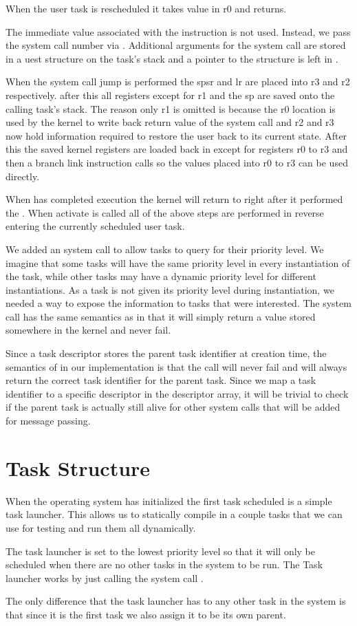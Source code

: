 \documentclass[pdftex,10pt,a4paper]{article}
\begin{document}
When the user task is rescheduled it takes value in r0 and returns.

The immediate value associated with the  instruction is not
used. Instead, we pass the system call number via . Additional
arguments for the system call are stored in a uest
structure on the task's stack and a pointer to the structure is left
in .

When the system call jump is performed the spsr and lr are placed into
r3 and r2 respectively. after this all registers except for r1 and the sp
are saved onto the calling task's stack. The reason only r1 is omitted is
because the r0 location is used by the kernel to write back return value of
the system call and r2 and r3 now hold information required to restore the user
back to its current state. After this the saved kernel registers are loaded back
in except for registers r0 to r3 and then a branch link instruction calls 
 so the values placed into r0 to r3 can be used directly.

When  has completed execution the kernel will return to right
after it performed the . When activate is called all of the
above steps are performed in reverse entering the currently scheduled user task.

We added an  system call to allow tasks to query
for their priority level. We imagine that some tasks will have the
same priority level in every instantiation of the task, while other
tasks may have a dynamic priority level for different
instantiations. As a task is not given its priority level during
instantiation, we needed a way to expose the information to tasks that
were interested. The  system call has the same
semantics as  in that it will simply return a value
stored somewhere in the kernel and never fail.

Since a task descriptor stores the parent task identifier at creation
time, the semantics of  in our implementation is
that the call will never fail and will always return the correct task
identifier for the parent task. Since we map a task identifier to a
specific descriptor in the descriptor array, it will be trivial to
check if the parent task is actually still alive for other system
calls that will be added for message passing.


\section*{Task Structure}

When the operating system has initialized the first task scheduled is a simple
task launcher. This allows us to statically compile in a couple tasks that we
can use for testing and run them all dynamically.

The task launcher is set to the lowest priority level so that it will only be
scheduled when there are no other tasks in the system to be run. The Task launcher
works by just calling the system call .

The only difference that the task launcher has to any other task in the system
is that since it is the first task we also assign it to be its own parent.
\end{document}
